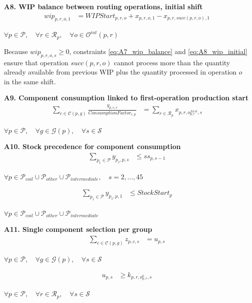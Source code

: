 \documentclass{article}
\begin{document}
\noindent\textbf{A8. WIP balance between routing operations, initial shift}
\begin{align}
wip_{p,r,o,1}
&=
WIPStart_{p,r,o}
+ x_{p,r,o,1}
- x_{p,r,succ(p,r,o),1}
\label{eq:A8_wip_initial}
\end{align}
\begin{center}
$\forall p \in \mathcal{P}, \quad
\forall r \in \mathcal{R}_p, \quad
\forall o \in \mathcal{O}^{int}(p,r)$
\end{center}

Because $wip_{p,r,o,s} \ge 0$, constraints \eqref{eq:A7_wip_balance} and \eqref{eq:A8_wip_initial} ensure that operation $succ(p,r,o)$ cannot process more than the quantity already available from previous WIP plus the quantity processed in operation $o$ in the same shift.

\noindent\textbf{A9. Component consumption linked to first-operation production start}
\begin{align}
\sum_{c \in \mathcal{C}(p,g)}
\frac{y_{p,c,s}}{ConsumptionFactor_{c,p}}
&=
\sum_{r \in \mathcal{R}_p}
x_{p,r,o^{first}_{p,r},s}
\label{eq:A9_component_consumption}
\end{align}
\begin{center}
$\forall p \in \mathcal{P}, \quad
\forall g \in \mathcal{G}(p), \quad
\forall s \in \mathcal{S}$
\end{center}

\noindent\textbf{A10. Stock precedence for component consumption}
\begin{align}
\sum_{p_1 \in \mathcal{P}} y_{p_1,p,s}
&\le
ss_{p,s-1}
\label{eq:A10_stock_precedence}
\end{align}
\begin{center}
$\forall p \in \mathcal{P}_{coil} \cup \mathcal{P}_{other} \cup \mathcal{P}_{intermediate}, \quad
s = 2,\dots,45$
\end{center}

\begin{align}
\sum_{p_1 \in \mathcal{P}} y_{p_1,p,1}
&\le
StockStart_p
\label{eq:A10_stock_precedence_initial}
\end{align}
\begin{center}
$\forall p \in \mathcal{P}_{coil} \cup \mathcal{P}_{other} \cup \mathcal{P}_{intermediate}$
\end{center}

\noindent\textbf{A11. Single component selection per group}
\begin{align}
\sum_{c \in \mathcal{C}(p,g)}
z_{p,c,s}
&=
u_{p,s}
\end{align}
\begin{center}
$\forall p \in \mathcal{P}, \quad
\forall g \in \mathcal{G}(p), \quad
\forall s \in \mathcal{S}$
\end{center}
\begin{align}
u_{p,s}
&\ge
k_{p,r,o^0_{p,r},s}
\end{align}
\begin{center}
$\forall p \in \mathcal{P}, \quad
\forall r \in \mathcal{R}_p, \quad
\forall s \in \mathcal{S}$
\end{center}
\end{document}
